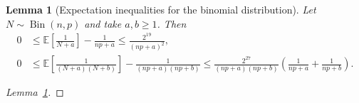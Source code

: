 \documentclass[11pt,lof]{puthesis}
\newcommand{\E}{\ensuremath{\mathbb{E}}}
\DeclareMathOperator{\Bin}{Bin}
\theoremstyle{break}
\newtheorem{lemma}{Lemma}[section]
\theoremstyle{proof}
\newtheorem{proof}{Proof}
\begin{document}
\begin{lemma}[Expectation inequalities for the binomial distribution]%
  \label{lem:mondrian_app_binomial_expectation}
  Let $N \sim \Bin(n, p)$ and take $a, b \geq 1$. Then
  \begin{align*}
    0
    &\leq
    \E \left[
      \frac{1}{N+a}
    \right]
    - \frac{1}{n p+a}
    \leq
    \frac{2^{19}}{(n p+a)^2}, \\
    0
    &\leq
    \E \left[
      \frac{1}{(N+a)(N+b)}
    \right]
    - \frac{1}{(n p+a)(n p+b)}
    \leq
    \frac{2^{27}}{(n p +a)(n p +b)}
    \left(
      \frac{1}{n p + a}
      + \frac{1}{n p + b}
    \right).
  \end{align*}

\end{lemma}

\begin{proof}[Lemma~\ref{lem:mondrian_app_binomial_expectation}]


\end{proof}
\end{document}

